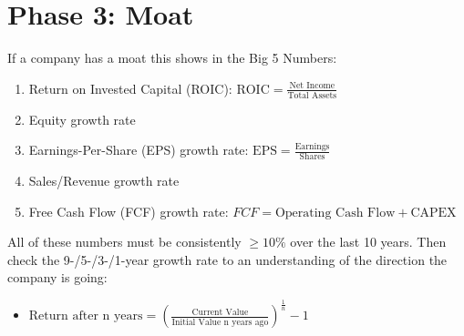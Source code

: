 \section{Phase 3: Moat}

If a company has a moat this shows in the Big 5 Numbers:
\begin{enumerate}
	\item Return on Invested Capital (ROIC): $\text{ROIC} = \frac{\text{Net Income}}{\text{Total Assets}}$
	\item Equity growth rate
	\item Earnings-Per-Share (EPS) growth rate: $\text{EPS} = \frac{\text{Earnings}}{\text{Shares}}$
	\item Sales/Revenue growth rate
	\item Free Cash Flow (FCF) growth rate: $FCF = \text{Operating Cash Flow} + \text{CAPEX}$
\end{enumerate}

All of these numbers must be consistently $\geq 10\%$ over the last 10 years. Then
check the 9-/5-/3-/1-year growth rate to an understanding of the direction the
company is going:

\begin{itemize}
    \item $\text{Return after n years} = {(\frac{\text{Current Value}}{\text{Initial Value n years ago}})}^{\frac{1}{n}} - 1$
\end{itemize}
